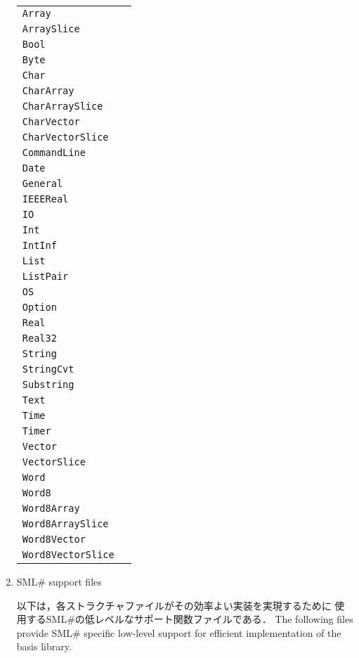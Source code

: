 \documentclass{jbook}
\newcommand{\txt}[2]{#2}
\newcommand{\smlsharp}{SML\#}
\newcommand{\code}[1]{\mbox{\large\tt #1}}
\begin{document}
\begin{enumerate}
\begin{tabular}{ll}
\code{Array}& \\
\code{ArraySlice}& \\
\code{Bool}& \\
\code{Byte}& \\
\code{Char}& \\
\code{CharArray}& \\
\code{CharArraySlice}& \\
\code{CharVector}& \\
\code{CharVectorSlice}& \\
\code{CommandLine}& \\
\code{Date}& \\
\code{General}& \\
\code{IEEEReal}& \\
\code{IO}& \\
\code{Int}& \\
\code{IntInf}& \\
\code{List}& \\
\code{ListPair}& \\
\code{OS}& \\
\code{Option}& \\
\code{Real}& \\
\code{Real32}& \\
\code{String}& \\
\code{StringCvt}& \\
\code{Substring}& \\
\code{Text}& \\
\code{Time}& \\
\code{Timer}& \\
\code{Vector}& \\
\code{VectorSlice}& \\
\code{Word}& \\
\code{Word8}& \\
\code{Word8Array}& \\
\code{Word8ArraySlice}& \\
\code{Word8Vector}& \\
\code{Word8VectorSlice}
\end{tabular}

\item \txt{\smlsharp{}サポートファイル}{\smlsharp{} support files}

\ifjp%
	以下は，各ストラクチャファイルがその効率よい実装を実現するために
使用する\smlsharp{}の低レベルなサポート関数ファイルである．
\else%
	The following files provide \smlsharp{} specific low-level
support for efficient implementation of the basis library.
\fi%


\end{enumerate}
\end{document}
